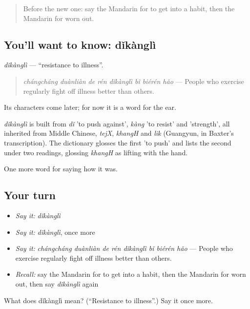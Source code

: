 \label{lesson:ZH-C484-dikangli}



\begin{quote}
Before the new one: say the Mandarin for to get into a habit, then the Mandarin for worn out.
\end{quote}

\subsection*{You'll want to know: dǐkànglì}
\emph{dǐkànglì} — \textquotedblleft{}resistance to illness\textquotedblright{}.

\begin{quote}
\emph{chángcháng duànliàn de rén dǐkànglì bǐ biérén hǎo} — People who exercise regularly fight off illness better than others.
\end{quote}

Its characters come later; for now it is a word for the ear.

\begin{cousinweb}
\emph{dǐkànglì} is built from \emph{dǐ} 'to push against', \emph{kàng} 'to resist' and  'strength', all inherited from Middle Chinese, \emph{tejX}, \emph{khangH} and \emph{lik} (Guangyun, in Baxter's transcription). The dictionary glosses the first 'to push' and lists the second under two readings, glossing \emph{khangH} as lifting with the hand.
\end{cousinweb}

\begin{grammarlens}[title={What you've built}]
One more word for saying how it was.
\end{grammarlens}

\subsection*{Your turn}
\begin{itemize}
\raggedright
  \item \emph{Say it:} \emph{dǐkànglì}
  \item \emph{Say it:} \emph{dǐkànglì}, once more
  \item \emph{Say it:} \emph{chángcháng duànliàn de rén dǐkànglì bǐ biérén hǎo} — People who exercise regularly fight off illness better than others.
  \item \emph{Recall:} say the Mandarin for to get into a habit, then the Mandarin for worn out, then say \emph{dǐkànglì} again
\end{itemize}

\begin{tcolorbox}[breakable,colback=teal!4,colframe=teal!35!black,title={Before you move on}]
What does dǐkànglì mean? (\textquotedblleft{}Resistance to illness\textquotedblright{}.) Say it once more.
\end{tcolorbox}
